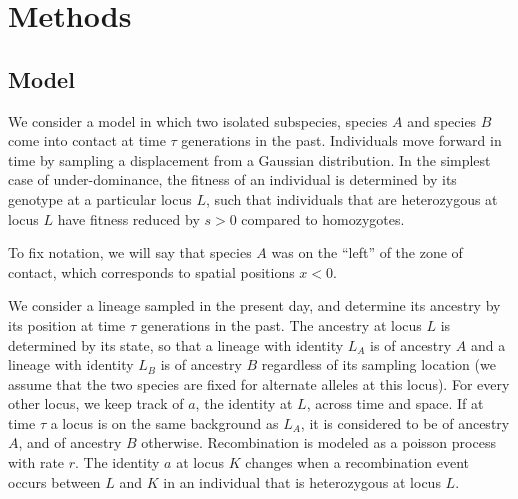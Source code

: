 \documentclass[12pt]{article}
\begin{document}



	
\section{Methods}
\subsection*{Model}
We consider a model in which two isolated subspecies, species $A$ and species $B$ come into contact at time $\tau$ generations in the past. Individuals move forward in time by sampling a displacement from a Gaussian distribution. In the simplest case of under-dominance, the fitness of an individual is determined by its genotype at a particular locus $L$, such that individuals that are heterozygous at locus $L$ have fitness reduced by $s>0$ compared to homozygotes.

To fix notation, we will say that species $A$ was on the ``left'' of the zone of contact,
which corresponds to spatial positions $x<0$.

We consider a lineage sampled in the present day, and determine its ancestry by its position at time $\tau$ generations in the past. The ancestry at locus $L$ is determined by its state, so that a lineage with identity $L_A$ is of ancestry $A$ and a lineage with identity $L_B$ is of ancestry $B$ regardless of its sampling location (we assume that the two species are fixed for alternate alleles at this locus). For every other locus, we keep track of $a$, the identity at $L$, across time and space. If at time $\tau$ a locus is on the same background as $L_A$, it is considered to be of ancestry $A$, and of ancestry $B$ otherwise. Recombination is modeled as a poisson process with rate $r$. The identity $a$ at locus $K$ changes when a recombination event occurs between $L$ and $K$ in an individual that is heterozygous at locus $L$. 
\end{document}
